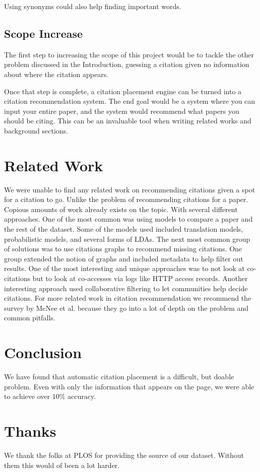 \documentclass[10pt, conference, compsocconf]{IEEEtran}
\begin{document}
Using synonyms could also help finding important words.

\subsection{Scope Increase}
The first step to increasing the scope of this project would be to tackle the other problem discussed in the Introduction,
guessing a citation given no information about where the citation appears.

Once that step is complete, a citation placement engine can be turned into a citation recommendation system.
The end goal would be a system where you can input your entire paper, and the system would recommend what papers
you should be citing. This can be an invaluable tool when writing related works and background sections.

\section{Related Work}\label{sec:related}
We were unable to find any related work on recommending citations given a spot for a citation to go.
Unlike the problem of recommending citations for a paper. Copious amounts of work already exists on the topic.
With several different approaches. One of the most common was using models to compare a paper and the rest
of the dataset. Some of the models used included translation models, probabilistic models, and several
forms of LDAs.\cite{cite1, cite2, cite3} The next most common group of solutions was to use citations
graphs to recommend missing citations.\cite{cite6} One group extended the notion of graphs and included metadata to help filter out results.\cite{cite4} One of the most 
interesting and unique approaches was to not look at co-citations but to look at co-accesses via logs like HTTP access records.\cite{cite7}
Another interesting approach used collaborative filtering to let communities help decide citations.\cite{cite8} For more related work in
citation recommendation we recommend the survey by McNee et al. because they go into a lot of depth on the problem and common pitfalls.\cite{cite5}

\section{Conclusion}\label{sec:conclusion}
We have found that automatic citation placement is a difficult, but doable problem.
Even with only the information that appears on the page, we were able to achieve over 10\% accuracy.

\section{Thanks}
We thank the folks at PLOS for providing the source of our dataset. Without them this would of been a lot harder.



\end{document}
